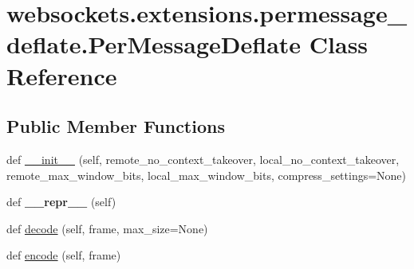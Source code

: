 \hypertarget{classwebsockets_1_1extensions_1_1permessage__deflate_1_1_per_message_deflate}{}\section{websockets.\+extensions.\+permessage\+\_\+deflate.\+Per\+Message\+Deflate Class Reference}
\label{classwebsockets_1_1extensions_1_1permessage__deflate_1_1_per_message_deflate}
\subsection*{Public Member Functions}
\begin{DoxyCompactItemize}
\item 
def \hyperlink{classwebsockets_1_1extensions_1_1permessage__deflate_1_1_per_message_deflate_a2e17b81a09635b8939bce43bf56274ef}{\+\_\+\+\_\+init\+\_\+\+\_\+} (self, remote\+\_\+no\+\_\+context\+\_\+takeover, local\+\_\+no\+\_\+context\+\_\+takeover, remote\+\_\+max\+\_\+window\+\_\+bits, local\+\_\+max\+\_\+window\+\_\+bits, compress\+\_\+settings=None)
\item 
\mbox{\label{classwebsockets_1_1extensions_1_1permessage__deflate_1_1_per_message_deflate_ac8a6e69b4ea53da6c75d4e43c641a080}} 
def {\bfseries \+\_\+\+\_\+repr\+\_\+\+\_\+} (self)
\item 
def \hyperlink{classwebsockets_1_1extensions_1_1permessage__deflate_1_1_per_message_deflate_a217dda0fb28f23b7071546827388c32b}{decode} (self, frame, max\+\_\+size=None)
\item 
def \hyperlink{classwebsockets_1_1extensions_1_1permessage__deflate_1_1_per_message_deflate_afbfa9d104a30d2b691356f067b380ca5}{encode} (self, frame)
\end{DoxyCompactItemize}
